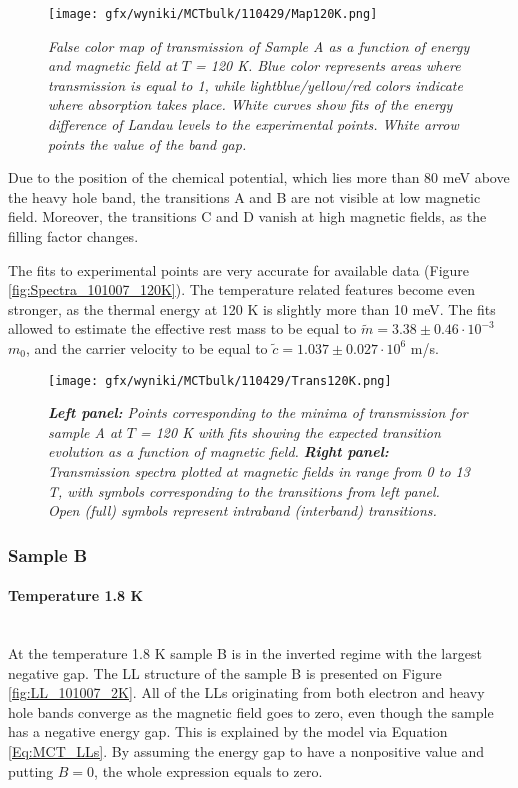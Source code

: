 \documentclass[titlepage,a4paper]{book}
\newcommand{\wciecie}{\quad\phantom{v}}
\newcommand{\myparagraph}[1]{\paragraph{#1}\mbox{}\\}
\begin{document}
\begin{figure}[ht]
	\centering
	\texttt{[image: gfx/wyniki/MCTbulk/110429/Map120K.png]}
	\vspace{-10pt}
	\caption{\textit{False color map of transmission of Sample A as a function of energy and magnetic field at $T$ = 120 K. Blue color represents areas where transmission is equal to 1, while lightblue/yellow/red colors indicate where absorption takes place. White curves show fits of the energy difference of Landau levels to the experimental points. White arrow points the value of the band gap.}}
	\label{fig:Map_110429_120K}
\end{figure} 
Due to the position of the chemical potential, which lies more than 80 meV above the heavy hole band, the transitions A and B are not visible at low magnetic field. Moreover, the transitions C and D vanish at high magnetic fields, as the filling factor changes. 

The fits to experimental points are very accurate for available data (Figure \ref{fig:Spectra_101007_120K}). The temperature related features become even stronger, as the thermal energy at 120 K is slightly more than 10 meV. The fits allowed to estimate the effective rest mass to be equal to $\tilde m = 3.38 \pm 0.46 \cdot 10^{-3}$ $m_0$, and the carrier velocity to be equal to $\tilde{c} = 1.037 \pm 0.027 \cdot 10^6$ m/s. 

\begin{figure}[ht]
	\centering
	\texttt{[image: gfx/wyniki/MCTbulk/110429/Trans120K.png]}
	\vspace{-10pt}
	\caption{\textit{\textbf{Left panel:} Points corresponding to the minima of transmission for sample A at $T$ = 120 K with fits showing the expected transition evolution as a function of magnetic field. \textbf{Right panel:} Transmission spectra plotted at magnetic fields in range from 0 to 13 T, with symbols corresponding to the transitions from left panel. Open (full) symbols represent intraband (interband) transitions.}}
	\label{fig:Spectra_110429_120K}
\end{figure}

\clearpage
\subsubsection{Sample B}
\myparagraph{Temperature 1.8 K}
\wciecie
At the temperature 1.8 K sample B is in the inverted regime with the largest negative gap. The LL structure of the sample B is presented on Figure \ref{fig:LL_101007_2K}. All of the LLs originating from both electron and heavy hole bands converge as the magnetic field goes to zero, even though the sample has a negative energy gap. This is explained by the model via Equation \ref{Eq:MCT_LLs}. By assuming the energy gap to have a nonpositive value and putting $B = 0$, the whole expression equals to zero.
\end{document}
